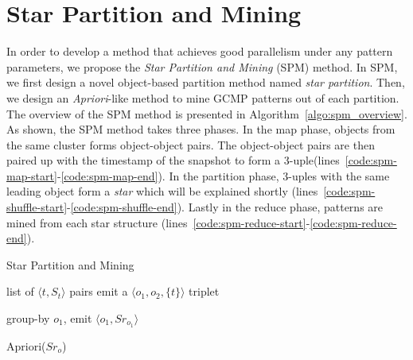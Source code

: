 \section{Star Partition and Mining}
\label{sec:spm_solution}
In order to develop a method that achieves good parallelism under any pattern parameters, 
we propose the \emph{Star Partition and Mining} (SPM) method. In SPM,
we first design a novel object-based partition method named \emph{star partition}. 
Then, we design an \emph{Apriori}-like 
method to mine GCMP patterns out of each partition.
The overview of the SPM method is presented in Algorithm~\ref{algo:spm_overview}.
As shown, the SPM method takes three phases. 
In the map phase, objects from the same cluster forms object-object pairs. 
The object-object pairs are then paired up with the timestamp of 
the snapshot to form a 3-uple(lines~\ref{code:spm-map-start}-\ref{code:spm-map-end}). 
In the partition phase, 3-uples with the same leading object form a \emph{star} which will be explained shortly 
(lines~\ref{code:spm-shuffle-start}-\ref{code:spm-shuffle-end}).
Lastly in the reduce phase, patterns are mined from each star structure (lines~\ref{code:spm-reduce-start}-\ref{code:spm-reduce-end}).

\begin{algorithm}
\caption{Star Partition and Mining}
\label{algo:spm_overview}
\begin{algorithmic}[1]
\Require list of $\langle t, S_t \rangle$ pairs
\label{code:spm-map-start}
		  \label{code:spm-edge-direct}
			\State emit a $\langle o_1, o_2, \{t\}\rangle$ triplet
		\EndIf
	\EndFor
\EndFor
\label{code:spm-map-end}

\label{code:spm-shuffle-start}
	\State group-by $o_1$, emit $\langle o_1, Sr_{o_1} \rangle$ 
\EndFor
\label{code:spm-shuffle-end}

\label{code:spm-reduce-start}
\State Apriori($Sr_o$)
\EndFor
\label{code:spm-reduce-end}

\end{algorithmic}
\end{algorithm}


